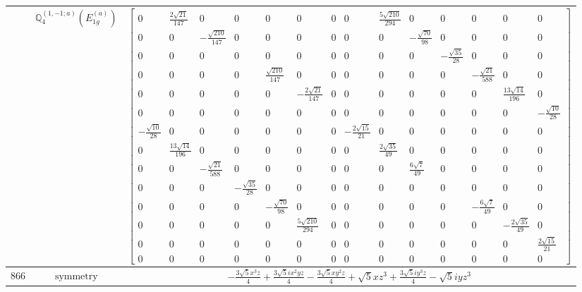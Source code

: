 \documentclass[fleqn,8pt,landscape]{jsarticle}
\begin{document}
\begin{longtable}{ccc}
$  $ & $ \mathbb{Q}_{4}^{(1,-1;a)}(E_{1g}^{(a)}) $ & $ \begin{bmatrix} 0 & \frac{2 \sqrt{21}}{147} & 0 & 0 & 0 & 0 & 0 & 0 & \frac{5 \sqrt{210}}{294} & 0 & 0 & 0 & 0 & 0 \\ 0 & 0 & - \frac{\sqrt{210}}{147} & 0 & 0 & 0 & 0 & 0 & 0 & - \frac{\sqrt{70}}{98} & 0 & 0 & 0 & 0 \\ 0 & 0 & 0 & 0 & 0 & 0 & 0 & 0 & 0 & 0 & - \frac{\sqrt{35}}{28} & 0 & 0 & 0 \\ 0 & 0 & 0 & 0 & \frac{\sqrt{210}}{147} & 0 & 0 & 0 & 0 & 0 & 0 & - \frac{\sqrt{21}}{588} & 0 & 0 \\ 0 & 0 & 0 & 0 & 0 & - \frac{2 \sqrt{21}}{147} & 0 & 0 & 0 & 0 & 0 & 0 & \frac{13 \sqrt{14}}{196} & 0 \\ 0 & 0 & 0 & 0 & 0 & 0 & 0 & 0 & 0 & 0 & 0 & 0 & 0 & - \frac{\sqrt{10}}{28} \\ - \frac{\sqrt{10}}{28} & 0 & 0 & 0 & 0 & 0 & 0 & - \frac{2 \sqrt{15}}{21} & 0 & 0 & 0 & 0 & 0 & 0 \\ 0 & \frac{13 \sqrt{14}}{196} & 0 & 0 & 0 & 0 & 0 & 0 & \frac{2 \sqrt{35}}{49} & 0 & 0 & 0 & 0 & 0 \\ 0 & 0 & - \frac{\sqrt{21}}{588} & 0 & 0 & 0 & 0 & 0 & 0 & \frac{6 \sqrt{7}}{49} & 0 & 0 & 0 & 0 \\ 0 & 0 & 0 & - \frac{\sqrt{35}}{28} & 0 & 0 & 0 & 0 & 0 & 0 & 0 & 0 & 0 & 0 \\ 0 & 0 & 0 & 0 & - \frac{\sqrt{70}}{98} & 0 & 0 & 0 & 0 & 0 & 0 & - \frac{6 \sqrt{7}}{49} & 0 & 0 \\ 0 & 0 & 0 & 0 & 0 & \frac{5 \sqrt{210}}{294} & 0 & 0 & 0 & 0 & 0 & 0 & - \frac{2 \sqrt{35}}{49} & 0 \\ 0 & 0 & 0 & 0 & 0 & 0 & 0 & 0 & 0 & 0 & 0 & 0 & 0 & \frac{2 \sqrt{15}}{21} \\ 0 & 0 & 0 & 0 & 0 & 0 & 0 & 0 & 0 & 0 & 0 & 0 & 0 & 0 \end{bmatrix} $ \\ \hline
$ 866 $ & $ \text{symmetry} $ & $ - \frac{3 \sqrt{5} x^{3} z}{4} + \frac{3 \sqrt{5} i x^{2} y z}{4} - \frac{3 \sqrt{5} x y^{2} z}{4} + \sqrt{5} x z^{3} + \frac{3 \sqrt{5} i y^{3} z}{4} - \sqrt{5} i y z^{3} $ \\

\end{longtable}
\end{document}

